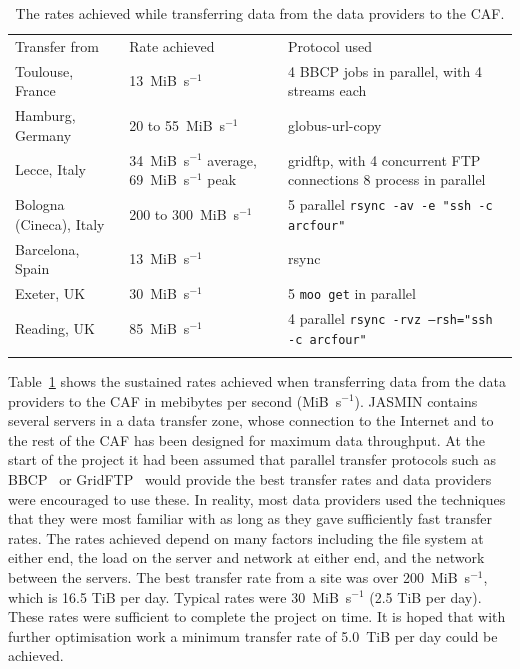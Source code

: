 \documentclass[gmd, manuscript]{copernicus}
\begin{document}
\begin{table}[t]
	\caption{The rates achieved while transferring data from the data providers to the CAF.}
	\begin{tabular}{lll}
		\tophline
		Transfer from & Rate achieved & Protocol used \\
		\middlehline
		Toulouse, France & 13~MiB~s$^{-1}$ & 4 BBCP jobs in parallel, with 4 streams each \\
		Hamburg, Germany & 20 to 55~MiB~s$^{-1}$ & globus-url-copy \\
		Lecce, Italy & 34~MiB~s$^{-1}$ average, 69~MiB~s$^{-1}$ peak & gridftp, with 4 concurrent FTP connections 8 process in parallel \\
		Bologna (Cineca), Italy & 200 to 300~MiB~s$^{-1}$ & 5 parallel \texttt{rsync -av -e "ssh -c arcfour"} \\
		Barcelona, Spain & 13~MiB~s$^{-1}$ & rsync \\
		Exeter, UK & 30~MiB~s$^{-1}$ & 5 \texttt{moo get} in parallel \\
		Reading, UK & 85~MiB~s$^{-1}$ & 4 parallel \texttt{rsync -rvz --rsh="ssh -c arcfour"} \\
		\bottomhline
	\end{tabular}
	\belowtable{} %
	\label{rates_achieved}
\end{table}


Table~\ref{rates_achieved} shows the sustained rates achieved when transferring data from the data providers to the CAF in mebibytes per second (MiB~s$^{-1}$). JASMIN contains several servers in a data transfer zone, whose connection to the Internet and to the rest of the CAF has been designed for maximum data throughput. At the start of the project it had been assumed that parallel transfer protocols such as BBCP~\citep{bbcp} or GridFTP~\citep{Foster}\citep{Globus} would provide the best transfer rates and data providers were encouraged to use these. In reality, most data providers used the techniques that they were most familiar with as long as they gave sufficiently fast transfer rates. The rates achieved depend on many factors including the file system at either end, the load on the server and network at either end, and the network between the servers. The best transfer rate from a site was over 200~MiB~s$^{-1}$, which is 16.5 TiB per day. Typical rates were 30~MiB~s$^{-1}$ (2.5 TiB per day). These rates were sufficient to complete the project on time. It is hoped that with further optimisation work a minimum transfer rate of 5.0~TiB per day could be achieved.
\end{document}
